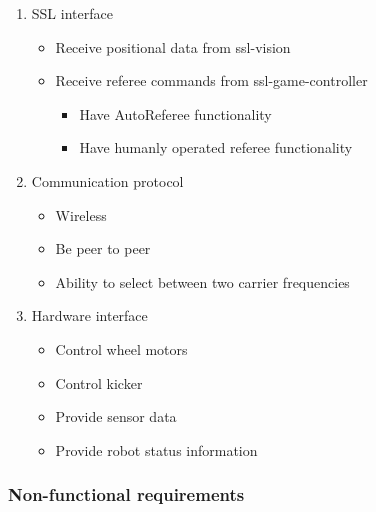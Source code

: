 \begin{enumerate}
\begin{itemize}
    \end{itemize}
    \item SSL interface
    \begin{itemize}
        \item Receive positional data from ssl-vision
        \item Receive referee commands from ssl-game-controller
        \begin{itemize}
            \item Have AutoReferee functionality
            \item Have humanly operated referee functionality
        \end{itemize} 
    \end{itemize}
    \item Communication protocol
    \begin{itemize}
        \item Wireless
        \item Be peer to peer
        \item Ability to select between two carrier frequencies
    \end{itemize}
    \item Hardware interface
    \begin{itemize}
        \item Control wheel motors
        \item Control kicker
        \item Provide sensor data
        \item Provide robot status information
    \end{itemize}
\end{enumerate}



\subsubsection{Non-functional requirements}

